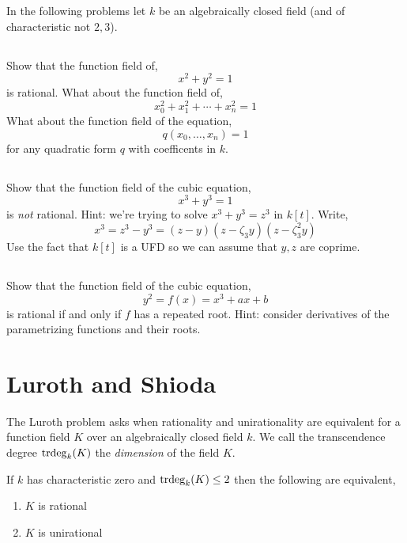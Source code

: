 \documentclass[12pt]{article}
\begin{document}
In the following problems let $k$ be an algebraically closed field (and of characteristic not $2,3$).

\subsection{}

Show that the function field of,
\[ x^2 + y^2 = 1 \]
is rational. What about the function field of,
\[ x^2_0 + x_1^2 + \cdots + x_n^2 = 1 \]
What about the function field of the equation,
\[ q(x_0, \dots, x_n) = 1 \]
for any quadratic form $q$ with coefficents in $k$.

\subsection{}

Show that the function field of the cubic equation,
\[ x^3 + y^3 = 1  \]
is \textit{not} rational. Hint: we're trying to solve $x^3 + y^3 = z^3$ in $k[t]$. Write,
\[ x^3 = z^3 - y^3 = (z - y)(z - \zeta_3 y)(z - \zeta_3^2 y) \]
Use the fact that $k[t]$ is a UFD so we can assume that $y,z$ are coprime.  

\subsection{}

Show that the function field of the cubic equation,
\[ y^2 = f(x) = x^3 + a x + b  \]
is rational if and only if $f$ has a repeated root. Hint: consider derivatives of the parametrizing functions and their roots.


\section{Luroth and Shioda}

The Luroth problem asks when rationality and unirationality are equivalent for a function field $K$ over an algebraically closed field $k$. We call the transcendence degree $\mathrm{trdeg}_{k}(K)$ the \textit{dimension} of the field $K$.

\begin{theorem}
If $k$ has characteristic zero and $\mathrm{trdeg}_{k}(K) \le 2$ then the following are equivalent,
\begin{enumerate}
\item $K$ is rational
\item $K$ is unirational
\end{enumerate} 
\end{theorem}
\end{document}
